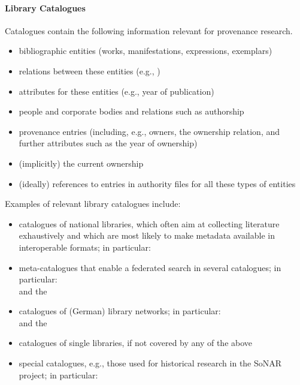 \paragraph{Library Catalogues}
%
Catalogues contain the following information relevant for provenance research.
%
\begin{itemize}
  \item
    bibliographic entities (works, manifestations, expressions, exemplars)
  \item
    relations between these entities (e.g., )
  \item
    attributes for these entities (e.g., year of publication)
  \item
    people and corporate bodies and relations such as authorship
  \item
    provenance entries (including, e.g., owners, the ownership relation, and further attributes such as the year of ownership)
  \item
    (implicitly) the current ownership
  \item
    (ideally) references to entries in authority files for all these types of entities
\end{itemize}
%
Examples of relevant library catalogues include:
%
\begin{itemize}
  \item
    catalogues of national libraries, which often aim at collecting literature exhaustively
    and which are most likely to make metadata available in interoperable formats;
    in particular: \\
     \autocite{DNBCatalogue,LoCcatalogue,BLcatalogue}
  \item
    meta-catalogues that enable a federated search in several catalogues;
    in particular: \\
     and the  \autocite{WorldCat,KVK}
  \item
    catalogues of (German) library networks;
    in particular: \\
    and the  \autocite{K10plus,B3KAT,hbz,hebis}
  \item
    catalogues of single libraries, if not covered by any of the above
  \item
    special catalogues, e.g., those used for historical research in the \gls{SoNAR} project; %
    in particular: \\
     \autocite{ZDB,KPE,ZEFYS,ExilePress}
\end{itemize}

